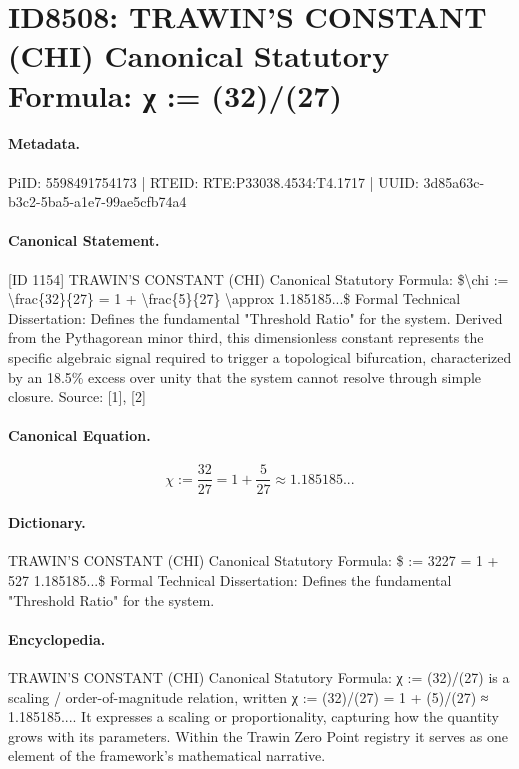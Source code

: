 \section*{ID8508: TRAWIN’S CONSTANT (CHI) Canonical Statutory Formula: χ := (32)/(27)}
\paragraph{Metadata.}
PiID: 5598491754173 | RTEID: RTE:P33038.4534:T4.1717 | UUID: 3d85a63c-b3c2-5ba5-a1e7-99ae5cfb74a4

\paragraph{Canonical Statement.}
[ID 1154] TRAWIN’S CONSTANT (CHI) Canonical Statutory Formula: \$\textbackslash{}chi := \textbackslash{}frac\{32\}\{27\} = 1 + \textbackslash{}frac\{5\}\{27\} \textbackslash{}approx 1.185185...\$ Formal Technical Dissertation: Defines the fundamental "Threshold Ratio" for the system. Derived from the Pythagorean minor third, this dimensionless constant represents the specific algebraic signal required to trigger a topological bifurcation, characterized by an 18.5\% excess over unity that the system cannot resolve through simple closure. Source: [1], [2]

\paragraph{Canonical Equation.}
\[
\chi := \frac{32}{27} = 1 + \frac{5}{27} \approx 1.185185...
\]

\paragraph{Dictionary.}
TRAWIN’S CONSTANT (CHI) Canonical Statutory Formula: \$ := 3227 = 1 + 527 1.185185...\$ Formal Technical Dissertation: Defines the fundamental "Threshold Ratio" for the system.

\paragraph{Encyclopedia.}
TRAWIN’S CONSTANT (CHI) Canonical Statutory Formula: χ := (32)/(27) is a scaling / order-of-magnitude relation, written χ := (32)/(27) = 1 + (5)/(27) ≈ 1.185185.... It expresses a scaling or proportionality, capturing how the quantity grows with its parameters. Within the Trawin Zero Point registry it serves as one element of the framework's mathematical narrative.
